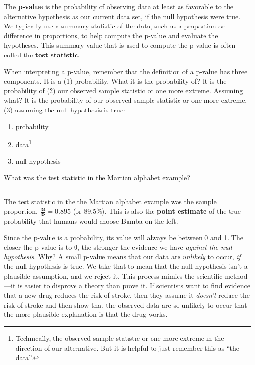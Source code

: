 \documentclass[
  10pt,
  openany]{book}
\providecommand{\tightlist}{%
  \setlength{\itemsep}{0pt}\setlength{\parskip}{0pt}}
\theoremstyle{definition}
\theoremstyle{definition}
\theoremstyle{definition}
\theoremstyle{definition}
\theoremstyle{remark}
\begin{document}
The \textbf{p-value} is the probability of observing data at least as favorable to the alternative hypothesis as our current data set, if the null hypothesis were true. We typically use a summary statistic of the data, such as a proportion or difference in proportions, to help compute the p-value and evaluate the hypotheses. This summary value that is used to compute the p-value is often called the \textbf{test statistic}.

When interpreting a p-value, remember that the definition of a p-value has three components. It is a (1) probability. What it is the probability of? It is the probability of (2) our observed sample statistic or one more extreme. Assuming what? It is the probability of our observed sample statistic or one more extreme, (3) assuming the null hypothesis is true:

\begin{enumerate}
\def\labelenumi{(\arabic{enumi})}
\tightlist
\item
  probability
\item
  data\footnote{Technically, the observed sample statistic or one more extreme in the direction of our alternative. But it is helpful to just remember this as ``the data''.}
\item
  null hypothesis
\end{enumerate}

What was the test statistic in the \hyperref[Martian]{Martian alphabet example}?

\begin{center}\rule{0.5\linewidth}{0.5pt}\end{center}

The test statistic in the the Martian alphabet example was the sample proportion, \(\frac{34}{38} = 0.895\) (or 89.5\%). This is also the \textbf{point estimate} of the true probability that humans would choose Bumba on the left.

Since the p-value is a probability, its value will always be between 0 and 1. The closer the p-value is to 0, the stronger the evidence we have \emph{against the null hypothesis}. Why? A small p-value means that our data are \emph{unlikely} to occur, \emph{if} the null hypothesis is true. We take that to mean that the null hypothesis isn't a plausible assumption, and we reject it. This process mimics the scientific method---it is easier to disprove a theory than prove it. If scientists want to find evidence that a new drug reduces the risk of stroke, then they assume it \emph{doesn't} reduce the risk of stroke and then show that the observed data are so unlikely to occur that the more plausible explanation is that the drug works.
\end{document}
